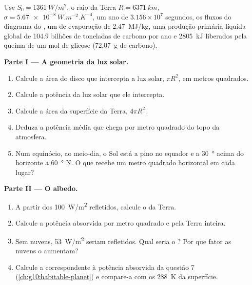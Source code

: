 \begin{problem}
\label{pb:g10:earth-energy-budget:1}
Use $S_0 = \qty{1361}{W/m^2}$, o raio da Terra $R = \qty{6371}{km}$,
$\sigma = \qty{5.67e-8}{W.m^{-2}.K^{-4}}$, um ano de $3.156\times10^7$
segundos, os fluxos do diagrama do , um  de
evaporação de \qty{2.47}{MJ/kg}, uma produção primária líquida global de
\num{104.9} bilhões de toneladas de carbono por ano e \qty{2805}{kJ}
liberados pela queima de um mol de glicose (\qty{72.07}{g} de carbono).

\medskip
\noindent\textbf{Parte I --- A geometria da luz solar.}
\begin{enumerate}
  \item Calcule a área do disco que intercepta a luz solar, $\pi R^2$, em
        metros quadrados.
  \item Calcule a potência da luz solar que ele intercepta.
  \item Calcule a área da superfície da Terra, $4\pi R^2$.
  \item Deduza a potência média que chega por metro quadrado do topo da
        atmosfera.
  \item Num equinócio, ao meio-dia, o Sol está a pino no equador e a
        \qty{30}{\degree} acima do horizonte a \qty{60}{\degree} N. O que
        recebe um metro quadrado horizontal em cada lugar?
\end{enumerate}

\medskip
\noindent\textbf{Parte II --- O albedo.}
\begin{enumerate}[resume]
  \item A partir dos \qty{100}{W/m^2} refletidos, calcule o  da Terra.
  \item Calcule a potência absorvida por metro quadrado e pela Terra
        inteira.
  \item Sem nuvens, \qty{53}{W/m^2} seriam refletidos. Qual seria o ?
        Por que fator as nuvens o aumentam?
  \item Calcule a  correspondente à potência
        absorvida da questão 7 (\cref{ch:g10:habitable-planet}) e
        compare-a com os \qty{288}{K} da superfície.
\end{enumerate}


\end{problem}
